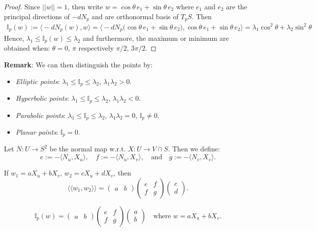 \begin{proof}
Since $||w|| = 1$, then write $w = \cos\theta\,e_1 + \sin\theta\,e_2$ where $e_1$ and $e_2$ are the principal directions of $-dN_p$ and are orthonormal basis of $T_pS$. Then
\begin{align*}
    \mathbb{I}_p(w) := \big\langle -dN_p(w), w\big\rangle = \Big\langle -dN_p\big(\cos\theta\,e_1 + \sin\theta\,e_2\big), \cos\theta\,e_1 + \sin\theta\,e_2\Big\rangle
    = \lambda_1\cos^2\theta + \lambda_2\sin^2\theta
\end{align*}
Hence, $\lambda_1\le\mathbb{I}_p(w)\le\lambda_2$ and furthermore, the maximum or minimum are obtained when: $\theta = 0$, $\pi$ respectively $\pi/2$, $3\pi/2$.
\end{proof}

\noindent\textbf{Remark}: We can then distinguish the points by:
\begin{itemize}
\item \textit{Elliptic points}: $\lambda_1\le\mathbb{I}_p\le\lambda_2$, $\lambda_1\lambda_2 > 0$.
\item \textit{Hyperbolic points}: $\lambda_1\le\mathbb{I}_p\le\lambda_2$, $\lambda_1\lambda_2 < 0$.
\item \textit{Parabolic points}: $\lambda_1\le\mathbb{I}_p\le\lambda_2$, $\lambda_1\lambda_2 = 0$, $\mathbb{I}_p\neq 0$.
\item \textit{Planar points}: $\mathbb{I}_p = 0$.
\end{itemize}

Let $N: U\to S^2$ be the normal map w.r.t. $X: U\to V\cap S$. Then we define:
\[
e := -\big\langle N_u, X_u\big\rangle, \quad f := -\big\langle N_u, X_v\big\rangle, \quad\text{and}\quad g := -\big\langle N_v, X_v\big\rangle.
\]

\begin{proposition}
If $w_1 = aX_u + bX_v$, $w_2 = cX_u + dX_v$, then
\[
\big\langle\langle w_1, w_2\rangle\big\rangle = \begin{pmatrix}a & b\end{pmatrix}\begin{pmatrix}e & f\\ f & g\end{pmatrix}\begin{pmatrix}c\\ d\end{pmatrix}.
\]
\end{proposition}

\begin{proposition}
\[
\mathbb{I}_p(w) = \begin{pmatrix}a & b\end{pmatrix}\begin{pmatrix}e & f\\ f & g\end{pmatrix}\begin{pmatrix}a\\ b\end{pmatrix} \quad\text{where } w = aX_u + bX_v.
\]
\end{proposition}

